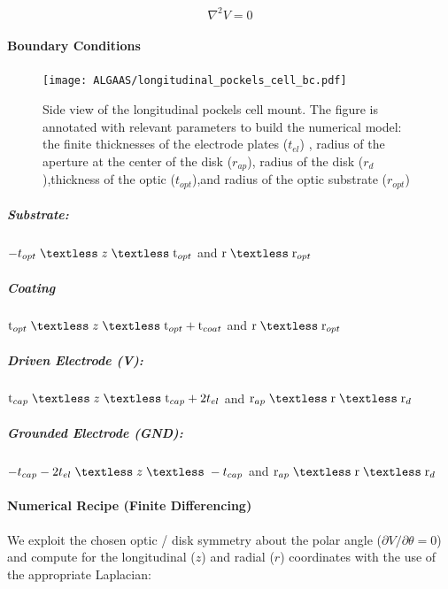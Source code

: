 \begin{equation}\label{eq:cyllap}
\nabla^2 V = 0
\end{equation}

\paragraph*{Boundary Conditions}

\begin{figure}[H]
  \centering
  \texttt{[image: ALGAAS/longitudinal\_pockels\_cell\_bc.pdf]}
\caption{Side view of the longitudinal pockels cell mount. The figure is annotated with relevant parameters to build the numerical model: the finite thicknesses of the electrode plates ($t_{el}$) , radius of the aperture at the center of the disk ($r_{ap}$), radius of the disk ($r_d$),thickness of the optic ($t_{opt}$),and radius of the optic substrate ($r_{opt}$)}
  \label{fig:laplacecoords}
\end{figure}


\subparagraph*{Substrate:}
$ -t_{opt} \; \textless \; z \; \textless \;\mathrm{t}_{opt} $ and $\mathrm{r} \; \textless \;\mathrm{r}_{opt}$
\subparagraph*{Coating}
$\mathrm{t}_{opt} \; \textless \; z \; \textless \;\mathrm{t}_{opt} +\mathrm{t}_{coat} $ and $\mathrm{r} \; \textless \;\mathrm{r}_{opt} $

\subparagraph*{Driven Electrode (V):}
$\mathrm{t}_{cap} \; \textless \; z \; \textless \;\mathrm{t}_{cap} + 2t_{el} $ and $\mathrm{r}_{ap} \; \textless \;\mathrm{r} \; \textless \;\mathrm{r}_{d} $

\subparagraph*{Grounded Electrode (GND):}
$ -t_{cap} -2t_{el} \; \textless \; z \; \textless \; -t_{cap} $ and $\mathrm{r}_{ap} \; \textless \;\mathrm{r} \; \textless \;\mathrm{r}_{d} $

\paragraph*{Numerical Recipe (Finite Differencing)}

We exploit the chosen optic / disk symmetry about the polar angle ($\partial V / \partial \theta = 0$) and compute for the longitudinal ($z$) and radial ($r$) coordinates with the use of the appropriate Laplacian:

